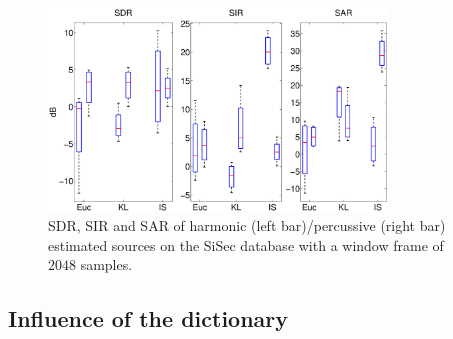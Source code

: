\begin{figure}[t]

  \centering 
  \includegraphics[width=9cm]{fig/NewDictDivTest}
  \caption{\label{frame2048} SDR, SIR and SAR of harmonic (left bar)/percussive (right bar) estimated sources on the SiSec database with a window frame of $2048$ samples.}
  
\end{figure}



\subsection{Influence of the dictionary}
\label{setup:dictionary}


